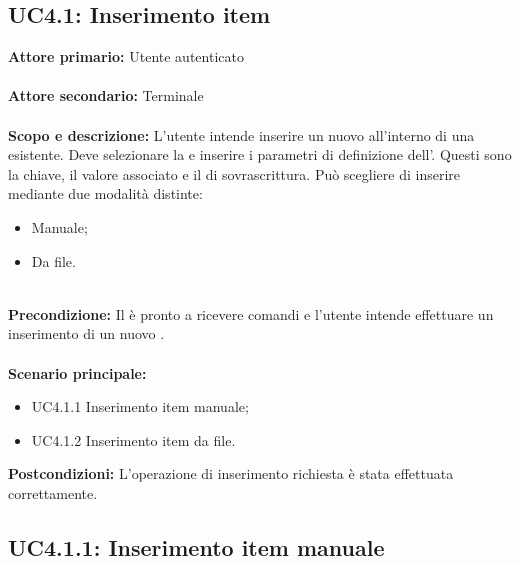 \documentclass{scalatekids-article}
\begin{document}
\subsection{UC4.1: Inserimento item}

\textbf{Attore primario:} Utente autenticato\\ \\
\textbf{Attore secondario:} Terminale\\ \\
\textbf{Scopo e descrizione:} L'utente intende inserire un nuovo  all'interno di una  esistente. Deve selezionare la  e inserire i parametri di definizione dell'. Questi sono la chiave, il valore associato e il  di sovrascrittura. Può scegliere di inserire
mediante due modalità distinte:
\begin{itemize}
\item Manuale;
\item Da file.
\end{itemize}
\\
\textbf{Precondizione:} Il  è pronto a ricevere comandi e l'utente intende effettuare un inserimento di un nuovo .\\ \\
\textbf{Scenario principale:}
\begin{itemize}
\item UC4.1.1 Inserimento item manuale;
\item UC4.1.2 Inserimento item da file.
\end{itemize}
\textbf{Postcondizioni:} L'operazione di inserimento richiesta è stata effettuata correttamente.

\subsection{UC4.1.1: Inserimento item manuale}
\end{document}
